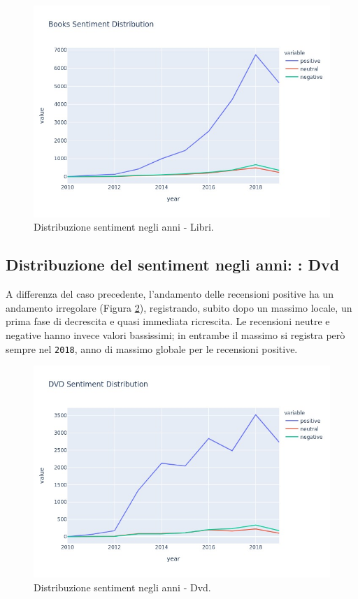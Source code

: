 			\begin{figure} [h]
				\includegraphics[width=\textwidth]{Figure/sent_year_books}
				\caption{Distribuzione sentiment negli anni - Libri.}
				\label{fig:sent_year_books}
			\end{figure}
		
		\subsection{Distribuzione del sentiment negli anni: : Dvd}
			A differenza del caso precedente, l'andamento delle recensioni positive ha un andamento irregolare (Figura \ref{fig:sent_year_dvd}), registrando, subito dopo un massimo locale, un prima fase di  decrescita e quasi immediata ricrescita. Le recensioni neutre e negative hanno invece valori bassissimi; in entrambe il massimo si registra però sempre nel \verb|2018|, anno di massimo globale per le recensioni positive.
			
			\begin{figure} [h]
				\includegraphics[width=\textwidth]{Figure/sent_year_dvd}
				\caption{Distribuzione sentiment negli anni - Dvd.}
				\label{fig:sent_year_dvd}
			\end{figure}
		
